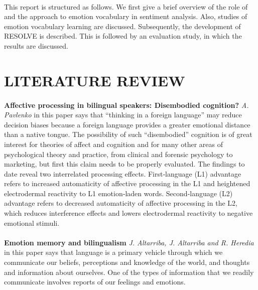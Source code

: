 \documentclass[a4paper,12pt,oneside]{article}
\begin{document}
\paragraph{}
This report is structured as follows. We first give a brief overview of the role of and the approach to emotion vocabulary in sentiment analysis. Also, studies of emotion vocabulary learning are discussed. Subsequently, the development of RESOLVE is described. This is followed by an evaluation study, in which the results are discussed. 


\newpage
\section{LITERATURE REVIEW}
\paragraph{}
\textbf{Affective processing in bilingual speakers: Disembodied cognition?} 
\textit{A. Pavlenko} in this paper says that
“thinking in a foreign language” may reduce decision biases because a foreign language provides a greater emotional distance than a native tongue. The possibility of such “disembodied” cognition is of great interest for theories of affect and cognition and for many other areas of psychological theory and practice, from clinical and forensic psychology to marketing, but first this claim needs to be properly evaluated. The findings to date reveal two interrelated processing effects. First‐language (L1) advantage refers to increased automaticity of affective processing in the L1 and heightened electrodermal reactivity to L1 emotion‐laden words. Second‐language (L2) advantage refers to decreased automaticity of affective processing in the L2, which reduces interference effects and lowers electrodermal reactivity to negative emotional stimuli. 
\paragraph{}
\textbf{Emotion memory and bilingualism} 
\textit{J. Altarriba, J. Altarriba and R. Heredia} in this paper says that
language is a primary vehicle through which we communicate our beliefs, perceptions and knowledge of the world, and thoughts and information about ourselves. One of the types of information that we readily communicate involves reports of our feelings and emotions.
\end{document}
